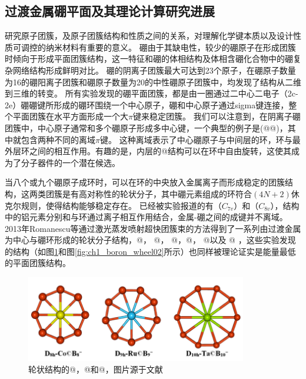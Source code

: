 \subsection{过渡金属硼平面及其理论计算研究进展}
研究原子团簇，及原子团簇结构和性质之间的关系，对理解化学键本质以及设计性质可调控的纳米材料有重要的意义。
硼由于其缺电性，较少的硼原子在形成团簇时倾向于形成平面团簇结构\cite{xu2017practical}，这一特征和硼的体相结构及体相含硼化合物中的硼复杂网络结构形成鲜明对比。
硼的阴离子团簇最大可达到23个原子\cite{alexandrova2004molecular,alexandrova2004electronic,kiran2005planar,alexandrova2006all,sergeeva2008photoelectron,huang2010concentric,sergeeva2011all,piazza2012photoelectron,sergeeva2012b22,zhai2003hydrocarbon,zhai2003hepta}，在硼原子数量为16的硼阳离子团簇和硼原子数量为20的中性硼原子团簇中，均发现了结构从二维到三维的转变\cite{kiran2005planar,tai2012structure,oger2007boron}。
所有实验发现的硼平面团簇，都是由一圈通过二中心二电子（2c-2e）硼硼键所形成的硼环围绕一个中心原子，硼和中心原子通过sigma键连接，整个平面团簇在水平方面形成一个大$\pi$键来稳定团簇。
我们可以注意到，在阴离子硼团簇中，中心原子通常和多个硼原子形成多中心键，一个典型的例子是(@@)\cite{huang2010concentric}，其中就包含两种不同的离域$\pi$键。
这种离域表示了中心硼原子与中间层的环，环与最外层环之间的相互作用。有趣的是，内层的@结构可以在环中自由旋转，这使其成为了分子器件的一个潜在候选。

当八个或九个硼原子成环时，可以在环的中央放入金属离子而形成稳定的团簇结构，这两类团簇是有高对称性的轮状分子，其中硼元素组成的环符合$(4N+2)$休克尔规则，使得结构能够稳定存在\cite{zhai2003hepta,alexandrova2004molecular}。
已经被实验报道的有（$C_{7v}$）和（$C_{8v}$）\cite{galeev2011valence}，结构中的铝元素分别和与环通过离子相互作用结合，金属-硼之间的成键并不离域。2013年Romanescu等通过激光蒸发喷射超快团簇束的方法得到了一系列由过渡金属为中心与硼环形成的轮状分子结构，@， @， @，@， @以及 @ \cite{romanescu2011aromatic,galeev2011valence,li2012transition}，这些实验发现的结构（如图\ref{fig:ch1_boron_wheel01}和图\ref{fig:ch1_boron_wheel02}所示）也同样被理论证实是能量最低的平面团簇结构。

\begin{figure}
  \includegraphics[width=0.86\textwidth]{figs/ch1_boron_wheel01.png}
  \centering
  \caption{轮状结构的@，@和@，图片源于文献\cite{romanescu2013transition}}
  \label{fig:ch1_boron_wheel01}
\end{figure}

